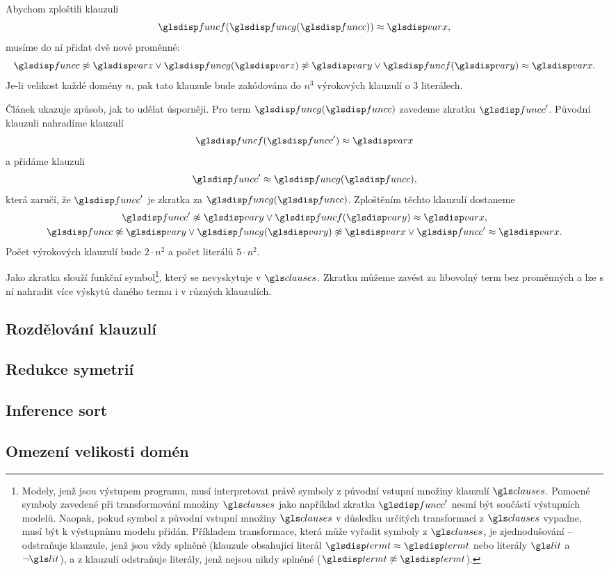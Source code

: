 Abychom zploštili klauzuli
\[
  \func(\funcG(\funcC)) \approx \var,
\]
musíme do ní přidat dvě nové proměnné:
\[
  \funcC \not\approx \varZ \vee
    \funcG(\varZ) \not\approx \varY \vee
    \func(\varY) \approx \var.
\]
Je-li velikost každé domény $n$, pak tato klauzule bude
zakódována do $n^3$ vý\-ro\-ko\-vých klauzulí o 3 literálech.

Článek \cite{claessen03paradox} ukazuje způsob, jak to udělat
úsporněji. Pro term $\funcG(\funcC)$ zavedeme zkratku $\funcC'$.
Původní klauzuli nahradíme klauzulí
\[
  \func(\funcC') \approx \var
\]
a přidáme klauzuli
\[
  \funcC' \approx \funcG(\funcC),
\]
která zaručí, že $\funcC'$ je zkratka za $\funcG(\funcC)$.
Zploštěním těchto klauzulí dostaneme
\begin{gather*}
  \funcC' \not\approx \varY \vee \func(\varY) \approx \var, \\
  \funcC \not\approx \varY \vee
    \funcG(\varY) \not\approx \var \vee
    \funcC' \approx \var.
\end{gather*}
Počet výrokových klauzulí bude $2 \cdot n^2$ a počet literálů
$5 \cdot n^2$.

Jako zkratka slouží funkční symbol\footnote{Modely, jenž jsou
výstupem programu, musí interpretovat právě symboly z původní vstupní množiny
klauzulí $\clauses$. Pomocné symboly zavedené
při transformování množiny $\clauses$ jako například zkratka $\funcC'$
nesmí být součástí výstupních modelů. Naopak, pokud symbol
z původní vstupní množiny $\clauses$ v důsledku určitých transformací
z $\clauses$ vypadne, musí být k výstupnímu modelu přidán.
Příkladem transformace, která může vyřadit symboly z $\clauses$,
je zjednodušování -- odstraňuje klauzule, jenž jsou vždy splněné
(klauzule obsahující literál $\term \approx \term$ nebo literály
$\lit$ a $\neg \lit$),
a z klauzulí odstraňuje literály, jenž nejsou nikdy splněné
($\term \not\approx \term$).},
který se nevyskytuje v $\clauses$.
Zkratku můžeme zavést za libovolný term bez proměnných
a lze s ní nahradit více výskytů daného termu i v různých klauzulích.

\subsection{Rozdělování klauzulí}

\subsection{Redukce symetrií}

\subsection{Inference sort}

\subsection{Omezení velikosti domén}
